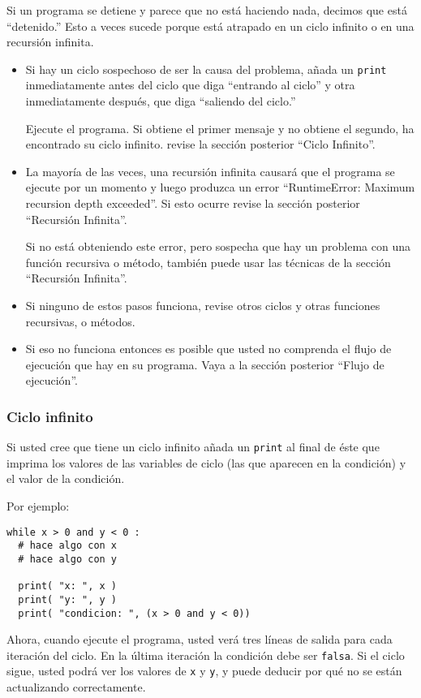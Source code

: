 Si un programa se detiene y parece que no está haciendo nada, decimos
que está ``detenido.'' Esto a veces sucede porque está atrapado
en un ciclo infinito o en una recursión infinita.
\begin{itemize}
\item Si hay un ciclo sospechoso de ser la causa del problema, añada un
\texttt{print} inmediatamente antes del ciclo que diga ``entrando
al ciclo'' y otra inmediatamente después, que diga ``saliendo del
ciclo.''

Ejecute el programa. Si obtiene el primer mensaje y no obtiene el
segundo, ha encontrado su ciclo infinito. revise la sección posterior
``Ciclo Infinito''.
\item La mayoría de las veces, una recursión infinita causará que el programa
se ejecute por un momento y luego produzca un error ``RuntimeError:
Maximum recursion depth exceeded''. Si esto ocurre revise la sección
posterior ``Recursión Infinita''.

Si no está obteniendo este error, pero sospecha que hay un problema
con una función recursiva o método, también puede usar las técnicas
de la sección ``Recursión Infinita''.
\item Si ninguno de estos pasos funciona, revise otros ciclos y otras funciones
recursivas, o métodos.
\item Si eso no funciona entonces es posible que usted no comprenda el flujo
de ejecución que hay en su programa. Vaya a la sección posterior ``Flujo
de ejecución''.
\end{itemize}

\subsubsection{Ciclo infinito}

  

Si usted cree que tiene un ciclo infinito añada un \texttt{print}
al final de éste que imprima los valores de las variables de ciclo
(las que aparecen en la condición) y el valor de la condición.

Por ejemplo:
\begin{verbatim}
while x > 0 and y < 0 :
  # hace algo con x
  # hace algo con y

  print( "x: ", x )
  print( "y: ", y )
  print( "condicion: ", (x > 0 and y < 0))
\end{verbatim}
 Ahora, cuando ejecute el programa, usted verá tres líneas de salida
para cada iteración del ciclo. En la última iteración la condición
debe ser \texttt{falsa}. Si el ciclo sigue, usted podrá ver los valores
de \texttt{x} y \texttt{y}, y puede deducir por qué no se están actualizando
correctamente.

